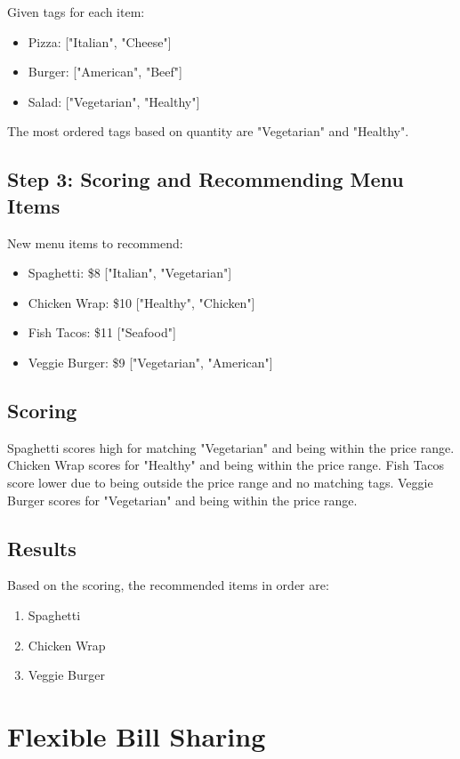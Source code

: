 Given tags for each item:
\begin{itemize}
    \item Pizza: ["Italian", "Cheese"]
    \item Burger: ["American", "Beef"]
    \item Salad: ["Vegetarian", "Healthy"]
\end{itemize}

The most ordered tags based on quantity are "Vegetarian" and "Healthy".

\subsection*{Step 3: Scoring and Recommending Menu Items}

New menu items to recommend:
\begin{itemize}
    \item Spaghetti: \$8 ["Italian", "Vegetarian"]
    \item Chicken Wrap: \$10 ["Healthy", "Chicken"]
    \item Fish Tacos: \$11 ["Seafood"]
    \item Veggie Burger: \$9 ["Vegetarian", "American"]
\end{itemize}

\subsection*{Scoring}

Spaghetti scores high for matching "Vegetarian" and being within the price range.
Chicken Wrap scores for "Healthy" and being within the price range.
Fish Tacos score lower due to being outside the price range and no matching tags.
Veggie Burger scores for "Vegetarian" and being within the price range.


\subsection*{Results}

Based on the scoring, the recommended items in order are:
\begin{enumerate}
    \item Spaghetti
    \item Chicken Wrap
    \item Veggie Burger
\end{enumerate}

\section{Flexible Bill Sharing}

